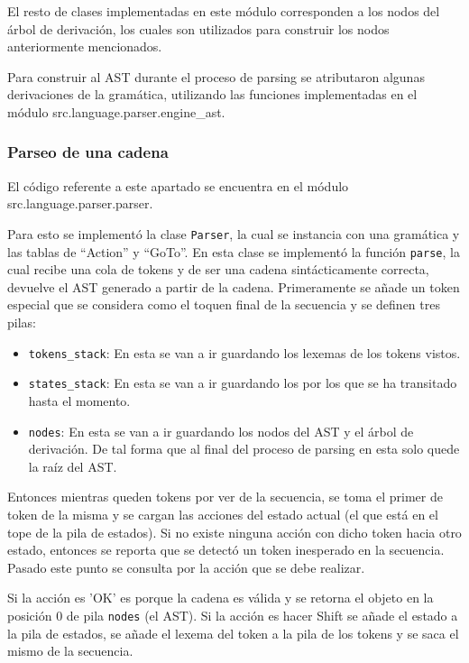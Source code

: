 El resto de clases implementadas en este m\'odulo corresponden a los nodos del \'arbol de derivaci\'on, los cuales son utilizados para construir los nodos anteriormente mencionados.

Para construir al AST durante el proceso de parsing se atributaron algunas derivaciones de la gram\'atica, utilizando las funciones implementadas en el m\'odulo src.language.parser.engine\_ast.

\subsubsection{Parseo de una cadena}

El c\'odigo referente a este apartado se encuentra en el m\'odulo src.language.parser.parser.

Para esto se implement\'o la clase \verb|Parser|, la cual se instancia con una gram\'atica y las tablas de ``Action'' y ``GoTo''. En esta clase se implement\'o la funci\'on \verb|parse|, la cual recibe una cola de tokens y de ser una cadena sint\'acticamente correcta, devuelve el AST generado a partir de la cadena. Primeramente se a\~{n}ade un token especial que se considera como el toquen final de la secuencia y se definen tres pilas:

\begin{itemize}
	\item \verb|tokens_stack|: En esta se van a ir guardando los lexemas de los tokens vistos.
	\item \verb|states_stack|: En esta se van a ir guardando los por los que se ha transitado hasta el momento.
	\item \verb|nodes|: En esta se van a ir guardando los nodos del AST y el \'arbol de derivaci\'on. De tal forma que al final del proceso de parsing en esta solo quede la ra\'iz del AST.
\end{itemize}

Entonces mientras queden tokens por ver de la secuencia, se toma el primer de token de la misma y se cargan las acciones del estado actual (el que est\'a en el tope de la pila de estados). Si no existe ninguna acci\'on con dicho token hacia otro estado, entonces se reporta que se detect\'o un token inesperado en la secuencia. Pasado este
punto se consulta por la acci\'on que se debe realizar. 

Si la acci\'on es 'OK' es porque la cadena es v\'alida y se retorna el objeto en la posici\'on 0 de pila \verb|nodes| (el AST). Si la acci\'on es hacer Shift se a\~{n}ade el estado a la pila de estados, se a\~{n}ade el lexema del token a la pila de los tokens y se saca el mismo de la secuencia.


